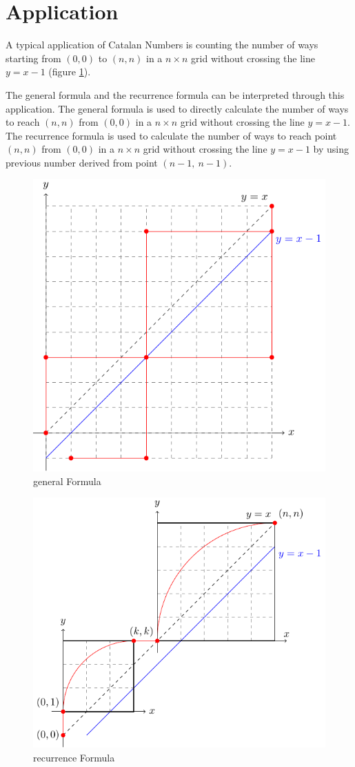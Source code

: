 \section{Application}

A typical application of Catalan Numbers is counting the number of ways starting from $(0, 0)$ to $(n, n)$ in a $n \times n$ grid without crossing the line $y = x-1$  (figure \ref*{fig:symmetry}).


The general formula and the recurrence formula can be interpreted through this application. The general formula is used to directly calculate the number of ways to reach $(n, n)$ from $(0, 0)$ in a $n \times n$ grid without crossing the line $y = x-1$. The recurrence formula is used to calculate the number of ways to reach point $(n, n)$ from $(0, 0)$ in a $n \times n$ grid without crossing the line $y = x-1$ by using previous number derived from point $(n-1, \ n-1)$.

\begin{multicols}{2}
    \begin{figure}[H]
        \centering
        \includegraphics[width=0.48\columnwidth]{figures/symmetry.pdf}
        \caption{general Formula}\label{fig:symmetry}
    \end{figure}
    \begin{figure}[H]
        \centering
        \includegraphics[width=0.56\columnwidth]{figures/recurrence.pdf}
        \caption{recurrence Formula}\label{fig:recurrence}
    \end{figure}
\end{multicols}


